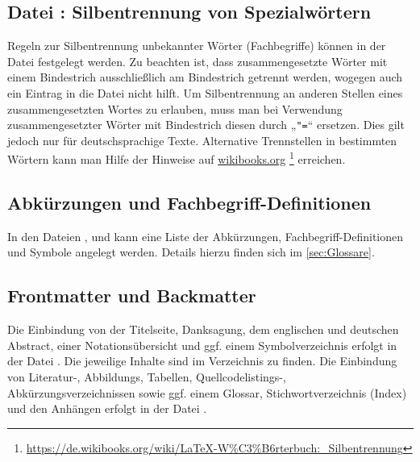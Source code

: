 \subsection[Datei \printfilepath{Hyphenation.tex}: Silbentrennung von Spezialwörtern]{Datei : Silbentrennung von Spezialwörtern}%
%
\label{sec:Hyphenation}
%
Regeln zur Silbentrennung unbekannter Wörter (\zB Fachbegriffe)
können in der Datei  festgelegt werden.
Zu beachten ist, dass zusammengesetzte Wörter mit einem Bindestrich
ausschließlich am Bindestrich getrennt werden,
wogegen auch ein Eintrag in die Datei  nicht hilft.
Um Silbentrennung an anderen Stellen eines zusammengesetzten Wortes zu erlauben,
muss man bei Verwendung zusammengesetzter Wörter mit Bindestrich diesen durch „\verb+"=+“ ersetzen.
Dies gilt jedoch nur für deutschsprachige Texte.
Alternative Trennstellen in bestimmten Wörtern kann man Hilfe der Hinweise auf 
\href{https://de.wikibooks.org/wiki/LaTeX-W%C3%B6rterbuch:_Silbentrennung}{wikibooks.org}%
\footnote{\url{https://de.wikibooks.org/wiki/LaTeX-W%C3%B6rterbuch:_Silbentrennung}}
erreichen.


\subsection[Abkürzungen und Fachbegriff-Definitionen]{Abkürzungen und Fachbegriff-Definitionen}%
%
%
%
%
\label{sec:Abkuerzungen}
%
In den Dateien
,
 und
kann eine Liste der Abkürzungen, Fachbegriff-Definitionen und Symbole angelegt werden.
Details hierzu finden sich im \cref{sec:Glossare}.


\subsection[Frontmatter und Backmatter]{Frontmatter und Backmatter}%
%
%
%
%
%
%
%
%
%
%
%
\label{sec:FrontmatterBackmatter}
%
Die Einbindung von der Titelseite, Danksagung, dem englischen und deutschen Abstract,
einer Notationsübersicht und ggf. einem Symbolverzeichnis
erfolgt in der Datei .
Die jeweilige Inhalte sind im Verzeichnis  zu finden.
Die Einbindung von Literatur-, Abbildungs, Tabellen, Quellcodelistings-, Abkürzungsverzeichnissen sowie ggf. einem Glossar, Stichwortverzeichnis (Index) und den Anhängen erfolgt in der Datei .
